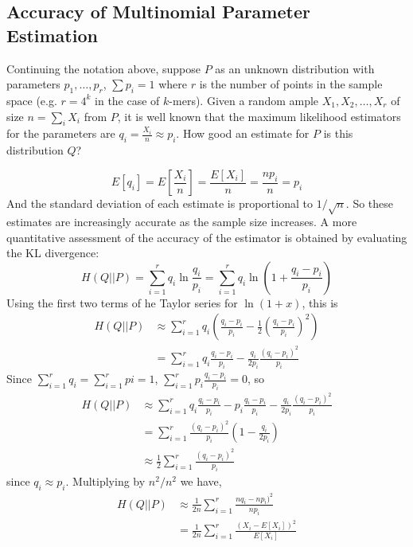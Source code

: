 \documentclass[letterpaper]{article}
\begin{document}
\subsection{Accuracy of Multinomial Parameter Estimation}

Continuing the notation above, suppose $P$ as an unknown distribution with
parameters $p_1, \dots, p_r$, $\sum p_i = 1$ where $r$ is the number of points
in the sample space (e.g. $r = 4^{k}$ in the case of $k$-mers). Given a random
ample $X_1, X_2, \dots, X_r$ of size $n = \sum_{i} X_i$ from $P$, it is well
known that the maximum likelihood estimators for the parameters are $q_i =
\frac{X_i}{n} \approx p_i$. How good an estimate for $P$ is this distribution
$Q$?

$$E[q_i] = E\left[\frac{X_i}{n}\right] = \frac{E[X_i]}{n} = \frac{np_i}{n} =
p_i$$
And the standard deviation of each estimate is proportional to $1/\sqrt{n}$. So
these estimates are increasingly accurate as the sample size increases. A more
quantitative assessment of the accuracy of the estimator is obtained by
evaluating the KL divergence:
$$H(Q||P)
= \sum_{i = 1}^{r} q_i \ln \frac{q_i}{p_i}
= \sum_{i = 1}^{r} q_i \ln \left(1 + \frac{q_i - p_i}{p_i} \right) $$
Using the first two terms of he Taylor series for $\ln (1 + x)$, this is
\begin{align*}
H(Q||P) &\approx \sum_{i = 1}^{r} q_i \left( \frac{q_i - p_i}{p_i} -
\frac{1}{2} \left( \frac{q_i - p_i}{p_i} \right)^2 \right ) \\
&= \sum_{i = 1}^{r} q_i \frac{q_i - p_i}{p_i} -
\frac{q_i}{2 p_i} \frac{(q_i - p_i)^2} {p_i}
\end{align*}
Since $\sum_{i = 1}^{r} q_i = \sum_{i = 1}^{r} pi = 1$,
$\sum_{i = 1}^{r} p_i \frac{q_i - p_i}{p_i} = 0$, so
\begin{align*}
H(Q||P) &\approx \sum_{i=1}^{r} q_i \frac{q_i - p_i}{p_i} - p_i \frac{q_i -
p_i}{p_i} - \frac{q_i}{2 p_i} \frac{(q_i - p_i)^2}{p_i} \\
&= \sum_{i=1}^{r} \frac{(q_i - p_i)^2}{p_i}\left(1 - \frac{q_i}{2 p_i}\right) \\
&\approx \frac{1}{2} \sum_{i=1}^{r} \frac{(q_i - p_i)^2}{p_i}
\end{align*}
since $q_i \approx p_i$. Multiplying by $n^2 / n^2$ we have,
\begin{align*}
H(Q||P) &\approx \frac{1}{2n} \sum_{i=1}^{r} \frac{n q_i - n p_i)^2}{n p_i} \\
        &= \frac{1}{2n} \sum_{i=1}^{r} \frac{(X_i - E[X_i])^2}{E[X_i]}
\end{align*}
\end{document}
